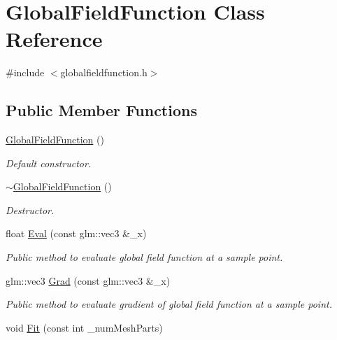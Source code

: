 \hypertarget{classGlobalFieldFunction}{}\section{Global\+Field\+Function Class Reference}
\label{classGlobalFieldFunction}


{\ttfamily \#include $<$globalfieldfunction.\+h$>$}

\subsection*{Public Member Functions}
\begin{DoxyCompactItemize}
\item 
\hyperlink{classGlobalFieldFunction_a0271c773597d0f768efaf377bd0fe38b}{Global\+Field\+Function} ()\hypertarget{classGlobalFieldFunction_a0271c773597d0f768efaf377bd0fe38b}{}\label{classGlobalFieldFunction_a0271c773597d0f768efaf377bd0fe38b}

\begin{DoxyCompactList}\small\item\em Default constructor. \end{DoxyCompactList}\item 
\hyperlink{classGlobalFieldFunction_adfe8046eb7a49ca76d50ce461b8fccde}{$\sim$\+Global\+Field\+Function} ()\hypertarget{classGlobalFieldFunction_adfe8046eb7a49ca76d50ce461b8fccde}{}\label{classGlobalFieldFunction_adfe8046eb7a49ca76d50ce461b8fccde}

\begin{DoxyCompactList}\small\item\em Destructor. \end{DoxyCompactList}\item 
float \hyperlink{classGlobalFieldFunction_a9226a98fa5f63736dae4155d99dec240}{Eval} (const glm\+::vec3 \&\+\_\+x)
\begin{DoxyCompactList}\small\item\em Public method to evaluate global field function at a sample point. \end{DoxyCompactList}\item 
glm\+::vec3 \hyperlink{classGlobalFieldFunction_a49bffb060b34cb87706aa0fc3884174a}{Grad} (const glm\+::vec3 \&\+\_\+x)
\begin{DoxyCompactList}\small\item\em Public method to evaluate gradient of global field function at a sample point. \end{DoxyCompactList}\item 
void \hyperlink{classGlobalFieldFunction_ad243a639230c57d507710c117751f5ab}{Fit} (const int \+\_\+num\+Mesh\+Parts)\hypertarget{classGlobalFieldFunction_ad243a639230c57d507710c117751f5ab}{}\label{classGlobalFieldFunction_ad243a639230c57d507710c117751f5ab}


\end{DoxyCompactItemize}
